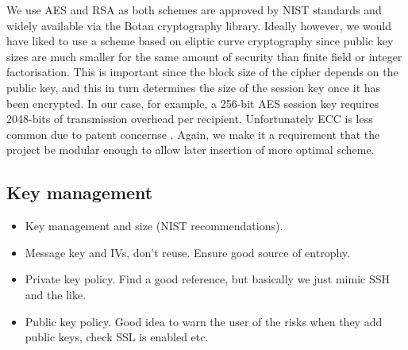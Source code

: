 We use AES and RSA as both schemes are approved by NIST standards \cite{nist} and widely available via the Botan cryptography library. Ideally however, we would have liked to use a scheme based on eliptic curve cryptography since public key sizes are much smaller for the same amount of security than finite field or integer factorisation. This is important since the block size of the cipher depends on the public key, and this in turn determines the size of the session key once it has been encrypted. In our case, for example, a 256-bit AES session key requires 2048-bits of transmission overhead per recipient. Unfortunately ECC is less common due to patent concernse \cite{XXX}. Again, we make it a requirement that the project be modular enough to allow later insertion of more optimal scheme.


\FloatBarrier
\subsection{Key management}        
	
    
\begin{itemize}


    \item Key management and size (NIST recommendations).
    \item Message key and IVs, don't reuse. Ensure good source of entrophy.
    \item Private key policy. Find a good reference, but basically we just mimic SSH and the like.
    \item Public key policy. Good idea to warn the user of the risks when they add public keys, check SSL is enabled etc.
\end{itemize}


\FloatBarrier
